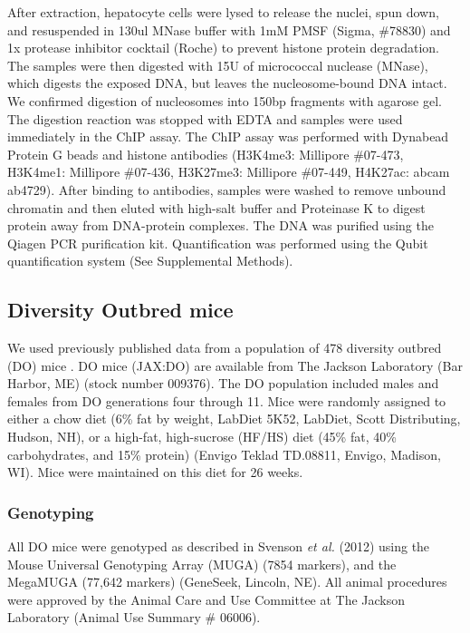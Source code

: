 \documentclass[
  11pt,
]{article}
\begin{document}
After extraction, hepatocyte cells were lysed to release the nuclei,
spun down, and resuspended in 130ul MNase buffer with 1mM PMSF (Sigma,
\#78830) and 1x protease inhibitor cocktail (Roche) to prevent histone
protein degradation. The samples were then digested with 15U of
micrococcal nuclease (MNase), which digests the exposed DNA, but leaves
the nucleosome-bound DNA intact. We confirmed digestion of nucleosomes
into 150bp fragments with agarose gel. The digestion reaction was
stopped with EDTA and samples were used immediately in the ChIP assay.
The ChIP assay was performed with Dynabead Protein G beads and histone
antibodies (H3K4me3: Millipore \#07-473, H3K4me1: Millipore \#07-436,
H3K27me3: Millipore \#07-449, H4K27ac: abcam ab4729). After binding to
antibodies, samples were washed to remove unbound chromatin and then
eluted with high-salt buffer and Proteinase K to digest protein away
from DNA-protein complexes. The DNA was purified using the Qiagen PCR
purification kit. Quantification was performed using the Qubit
quantification system (See Supplemental Methods).

\hypertarget{diversity-outbred-mice}{%
\subsection{Diversity Outbred mice}\label{diversity-outbred-mice}}

We used previously published data from a population of 478 diversity
outbred (DO) mice \citep{Svenson:2012hq}. DO mice (JAX:DO) are available
from The Jackson Laboratory (Bar Harbor, ME) (stock number 009376). The
DO population included males and females from DO generations four
through 11. Mice were randomly assigned to either a chow diet (6\% fat
by weight, LabDiet 5K52, LabDiet, Scott Distributing, Hudson, NH), or a
high-fat, high-sucrose (HF/HS) diet (45\% fat, 40\% carbohydrates, and
15\% protein) (Envigo Teklad TD.08811, Envigo, Madison, WI). Mice were
maintained on this diet for 26 weeks.

\hypertarget{genotyping}{%
\subsubsection{Genotyping}\label{genotyping}}

All DO mice were genotyped as described in Svenson \textit{et al.}
(2012) \citep{Svenson:2012hq} using the Mouse Universal Genotyping Array
(MUGA) (7854 markers), and the MegaMUGA (77,642 markers) (GeneSeek,
Lincoln, NE). All animal procedures were approved by the Animal Care and
Use Committee at The Jackson Laboratory (Animal Use Summary \# 06006).
\end{document}

